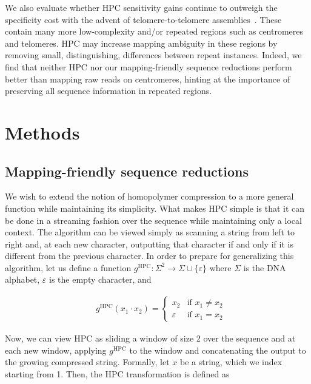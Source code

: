 \documentclass[
  11,
]{scrbook}
\begin{document}
We also evaluate whether HPC sensitivity gains continue to outweigh the
specificity cost with the advent of telomere-to-telomere
assemblies~\autocite{nurkCompleteSequenceHuman2021}. These contain many more
low-complexity and/or repeated regions such as centromeres and
telomeres. HPC may increase mapping ambiguity in these regions by
removing small, distinguishing, differences between repeat instances.
Indeed, we find that neither HPC nor our mapping-friendly sequence
reductions perform better than mapping raw reads on centromeres, hinting
at the importance of preserving all sequence information in repeated
regions.

\hypertarget{methods}{%
\section{Methods}\label{methods}}

\hypertarget{sec:msr-def}{%
\subsection{Mapping-friendly sequence reductions}\label{sec:msr-def}}

We wish to extend the notion of homopolymer compression to a more
general function while maintaining its simplicity. What makes HPC simple
is that it can be done in a streaming fashion over the sequence while
maintaining only a local context. The algorithm can be viewed simply as
scanning a string from left to right and, at each new character,
outputting that character if and only if it is different from the
previous character. In order to prepare for generalizing this algorithm,
let us define a function
\(g^\text{HPC} : \Sigma^2\rightarrow\Sigma\cup\{\varepsilon\}\) where
\(\Sigma\) is the DNA alphabet, \(\varepsilon\) is the empty character, and

\begin{align*}
    & g^\text{HPC}(x_1\cdot x_2) =
    \begin{cases}
        x_2 & \text{if } x_1 \neq x_2 \\
        \varepsilon & \text{if } x_1 = x_2
    \end{cases}
\end{align*}

Now, we can view HPC as sliding a window
of size 2 over the sequence and at each new window, applying
\(g^\text{HPC}\) to the window and concatenating the output to the growing
compressed string. Formally, let \(x\) be a string, which we index
starting from 1. Then, the HPC transformation is defined as
\end{document}
